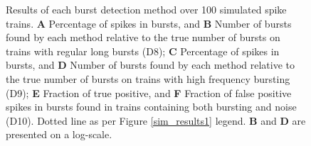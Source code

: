 \documentclass[12pt, titlepage]{article}
\begin{document}
		\begin{figure}
			\centering
			\caption{Results of each burst detection method over 100 simulated spike trains. \textbf{A} Percentage of spikes in bursts, and \textbf{B} Number of bursts found by each method relative to the true number of bursts on trains with regular long bursts (D8); \textbf{C} Percentage of spikes in bursts, and \textbf{D} Number of bursts found by each method relative to the true number of bursts on trains with high frequency bursting (D9); \textbf{E} Fraction of true positive, and \textbf{F} Fraction of false positive spikes in bursts found in trains containing both bursting and noise (D10). Dotted line as per Figure \ref{sim_results1} legend. \textbf{B} and \textbf{D} are presented on a log-scale.}
				\label{sim_results2}
		\end{figure}	
\end{document}
